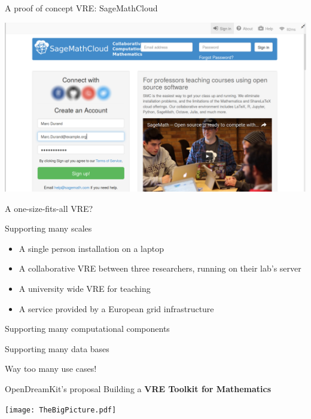\documentclass{beamer}
\begin{document}
\begin{frame}{A proof of concept VRE: SageMathCloud}
  \centerline{\includegraphics[width=\textwidth]{smc.png}}
\end{frame}

\begin{frame}{A one-size-fits-all VRE?}
  \pause
  \begin{block}{Supporting many scales}
    \begin{itemize}
    \item A single person installation on a laptop
    \item A collaborative VRE between three researchers, running on
      their lab's server
    \item A university wide VRE for teaching
    \item A service provided by a European grid infrastructure
    \end{itemize}
  \end{block}
  \pause

  \begin{block}{Supporting many computational components}
  \end{block}
  \pause

  \begin{block}{Supporting many data bases}
  \end{block}
  \pause

  \centerline{\color{red}Way too many use cases!}
\end{frame}

\begin{frame}{OpenDreamKit's proposal}\label{our-proposal}
  Building a \textbf{VRE Toolkit for Mathematics}
  \bigskip

  \texttt{[image: TheBigPicture.pdf]}
\end{frame}
\end{document}
